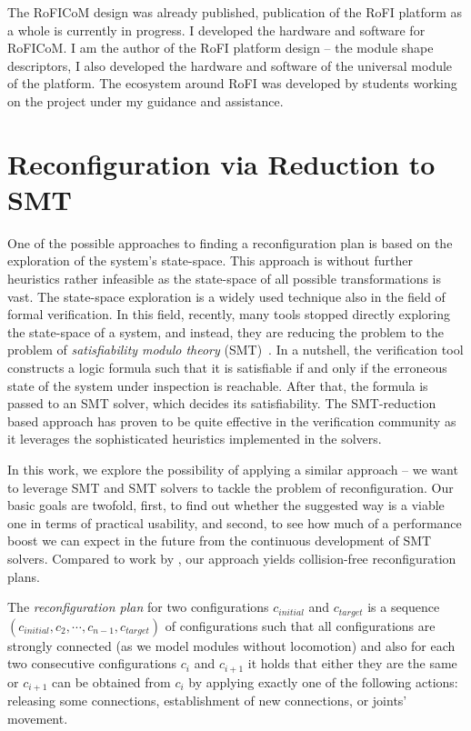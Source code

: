 The RoFICoM design was already published, publication of the RoFI platform as a
whole is currently in progress. I developed the hardware and software for
RoFICoM. I am the author of the RoFI platform design -- the module shape
descriptors, I also developed the hardware and software of the universal module
of the platform. The ecosystem around RoFI was developed by students working on
the project under my guidance and assistance.

\section{Reconfiguration via Reduction to SMT}\label{smt}

One of the possible approaches to finding a reconfiguration plan is based on the
exploration of the system's state-space. This approach is without further
heuristics rather infeasible as the state-space of all possible transformations
is vast. The state-space exploration is a widely used technique also in the
field of formal verification. In this field, recently, many tools stopped
directly exploring the state-space of a system, and instead, they are reducing
the problem to the problem of \emph{satisfiability modulo theory}
(SMT)~\cite{DBLP:series/faia/2009-185}. In a nutshell, the verification tool
constructs a logic formula such that it is satisfiable if and only if the
erroneous state of the system under inspection is reachable. After that, the
formula is passed to an SMT solver, which decides its satisfiability. The
SMT-reduction based approach has proven to be quite effective in the
verification community as it leverages the sophisticated heuristics implemented
in the solvers.

In this work, we explore the possibility of applying a similar approach -- we
want to leverage SMT and SMT solvers to tackle the problem of reconfiguration.
Our basic goals are twofold, first, to find out whether the suggested way is a
viable one in terms of practical usability, and second, to see how much of a
performance boost we can expect in the future from the continuous development of
SMT solvers. Compared to work by \textcite{DBLP:journals/pcs/GorbenkoP12}, our
approach yields collision-free reconfiguration plans.

The \emph{reconfiguration plan} for two configurations $c_{initial}$ and
$c_{target}$ is a sequence $(c_{initial}, c_2, \cdots, c_{n - 1}, c_{target})$
of configurations such that all configurations are strongly connected (as we
model modules without locomotion) and also for each two consecutive
configurations $c_i$ and $c_{i+1}$ it holds that either they are the same or
$c_{i+1}$ can be obtained from ${c_i}$  by applying exactly one of the following
actions: releasing some connections, establishment of new connections, or
joints' movement.

